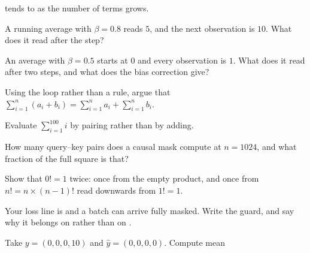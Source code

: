 \begin{testexercises}
  tends to as the number of terms grows.
\item A running average with $\beta = \num{0.8}$ reads $5$, and the next
  observation is $10$. What does it read after the step?
\item An average with $\beta = \num{0.5}$ starts at $0$ and every observation
  is $1$. What does it read after two steps, and what does the bias correction
  give?
\end{testexercises}

\begin{furtherproblems}
\item Using the loop rather than a rule, argue that
  $\sum_{i=1}^{n}(a_i + b_i) = \sum_{i=1}^{n} a_i + \sum_{i=1}^{n} b_i$.
\item Evaluate $\sum_{i=1}^{100} i$ by pairing rather than by adding.
\item How many query--key pairs does a causal mask compute at $n = 1024$, and
  what fraction of the full square is that?
\item Show that $0! = 1$ twice: once from the empty product, and once from
  $n! = n \times (n-1)!$ read downwards from $1! = 1$.
\item Your loss line is  and a batch can arrive fully
  masked. Write the guard, and say why it belongs on  rather than
  on .
\item Take $y = (0, 0, 0, 10)$ and $\hat{y} = (0, 0, 0, 0)$. Compute mean

\end{furtherproblems}
